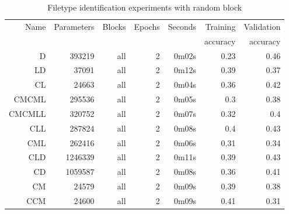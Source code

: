 \begin{table}[!ht]
    \centering
    \caption{Filetype identification experiments with random block}
    \label{tab:carving12-27}
\begin{tabular}{r|r|r|r|r|r|r}
\hline
Name & Parameters & Blocks & Epochs & Seconds & Training          & Validation          \\       
     &            &        &        &         &          accuracy &            accuracy \\ \hline\hline

D      & 393219  & all & 2 & 0m02s & 0.23 & 0.46 \\ \hline
LD     & 37091   & all & 2 & 0m12s & 0.39 & 0.37 \\ \hline
CL     & 24663   & all & 2 & 0m04s & 0.36 & 0.42 \\ \hline
CMCML  & 295536  & all & 2 & 0m05s & 0.3  & 0.38 \\ \hline
CMCMLL & 320752  & all & 2 & 0m07s & 0.32 & 0.4  \\ \hline
CLL    & 287824  & all & 2 & 0m08s & 0.4  & 0.43 \\ \hline
CML    & 262416  & all & 2 & 0m06s & 0.31 & 0.34 \\ \hline
CLD    & 1246339 & all & 2 & 0m11s & 0.39 & 0.43 \\ \hline
CD     & 1059587 & all & 2 & 0m08s & 0.36 & 0.41 \\ \hline
CM     & 24579   & all & 2 & 0m09s & 0.39 & 0.38 \\ \hline
CCM    & 24600   & all & 2 & 0m09s & 0.41 & 0.31 \\ \hline
\end{tabular}
\end{table}